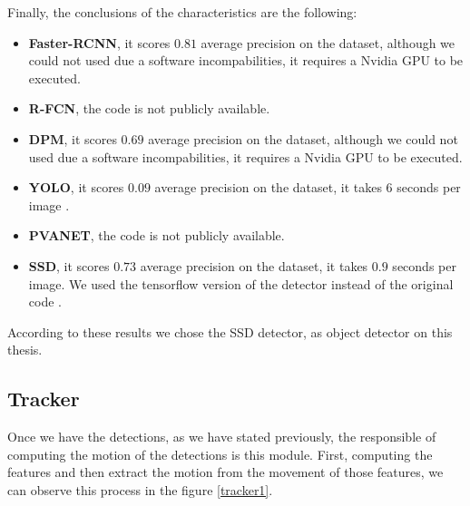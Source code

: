 \documentclass[12pt, a4paper, titlepage,twoside,openright]{article}
\begin{document}

Finally, the conclusions of the characteristics are the following:

\begin{itemize}

\item \textbf{Faster-RCNN}, it scores $0.81$ average precision on the dataset, although we could not used due a software incompabilities, it requires a Nvidia GPU to be executed.

\item \textbf{R-FCN}, the code is not publicly available.

\item \textbf{DPM}, it scores $0.69$ average precision on the dataset, although we could not used due a software incompabilities, it requires a Nvidia GPU to be executed.

\item \textbf{YOLO}, it scores $0.09$ average precision on the dataset, it takes $6$ seconds per image \cite{yoloDark}. 

\item \textbf{PVANET}, the code is not publicly available.

\item \textbf{SSD}, it scores $0.73$ average precision on the dataset, it takes $0.9$ seconds per image. We used the tensorflow version of the detector \cite{ssdCode} instead of the original code \cite{ssdCode2}.


\end{itemize}

According to these results we chose the SSD detector, as object detector on this thesis.


\subsection{Tracker}

Once we have the detections, as we have stated previously, the responsible of computing the motion of the detections is this module. First, computing the features and then extract the motion from the movement of those features, we can observe this process in the figure \ref{tracker1}.
\end{document}
